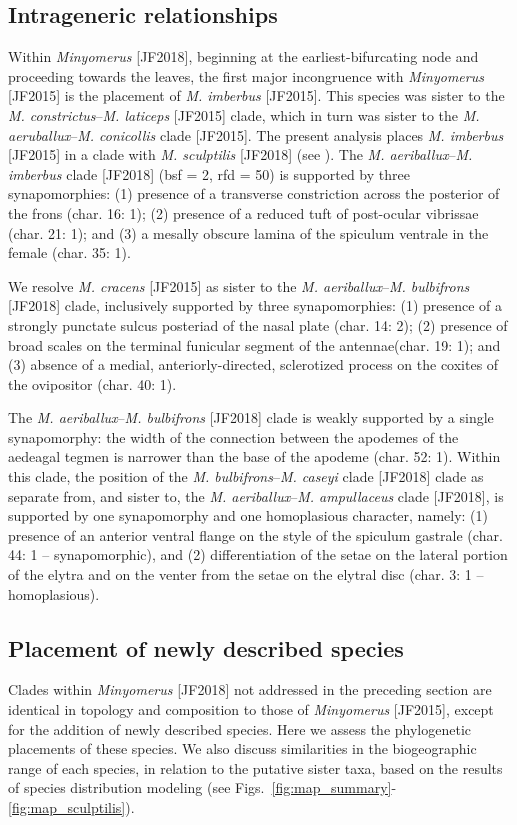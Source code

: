 \documentclass[fleqn,10pt,lineno]{wlpeerj} %
\begin{document}
	\subsection*{Intrageneric relationships}\label{ssec:diff}
		Within \textit{Minyomerus} [JF2018], beginning at the earliest-bifurcating node and proceeding towards the leaves, the first major incongruence with \textit{Minyomerus} [JF2015] is the placement of \textit{M. imberbus} [JF2015]. 
		This species was sister to the \textit{M. constrictus}--\textit{M. laticeps} [JF2015] clade, which in turn was sister to the \textit{M. aeruballux}--\textit{M. conicollis} clade [JF2015].
		The present analysis places \textit{M. imberbus} [JF2015] in a clade with \textit{M. sculptilis} [JF2018] (see \textbf{}).
		The \textit{M. aeriballux}--\textit{M. imberbus} clade [JF2018] (bsf = 2, rfd = 50) is supported by three synapomorphies: (1) presence of a transverse constriction across the posterior of the frons (char. 16: 1); (2) presence of a reduced tuft of post-ocular vibrissae (char. 21: 1); and (3) a mesally obscure lamina of the spiculum ventrale in the female (char. 35: 1).
		
		We resolve \textit{M. cracens} [JF2015] as sister to the \textit{M. aeriballux}--\textit{M. bulbifrons} [JF2018] clade, inclusively supported by three synapomorphies: (1) presence of a strongly punctate sulcus posteriad of the nasal plate (char. 14: 2); (2) presence of broad scales on the terminal funicular segment of the antennae(char. 19: 1); and (3) absence of a medial, anteriorly-directed, sclerotized process on the coxites of the ovipositor (char. 40: 1).
		
		The \textit{M. aeriballux}--\textit{M. bulbifrons} [JF2018] clade is weakly supported by a single synapomorphy: the width of the connection between the apodemes of the aedeagal tegmen is narrower than the base of the apodeme (char. 52: 1).
		Within this clade, the position of the \textit{M. bulbifrons}--\textit{M. caseyi} clade [JF2018] clade as separate from, and sister to, the \textit{M. aeriballux}--\textit{M. ampullaceus} clade [JF2018], is supported by one synapomorphy and one homoplasious character, namely: (1) presence of an anterior ventral flange on the style of the spiculum gastrale (char. 44: 1 -- synapomorphic), and (2) differentiation of the setae on the lateral portion of the elytra and on the venter from the setae on the elytral disc (char. 3: 1 -- homoplasious).		
		
	\subsection*{Placement of newly described species}\label{ssec:place}
		Clades within \textit{Minyomerus} [JF2018] not addressed in the preceding section are identical in topology and composition to those of \textit{Minyomerus} [JF2015], except for the addition of newly described species.
		Here we assess the phylogenetic placements of these species.
		We also discuss similarities in the biogeographic range of each species, in relation to the putative sister taxa, based on the results of species distribution modeling (see Figs.~\ref{fig:map_summary}-\ref{fig:map_sculptilis}).
\end{document}
